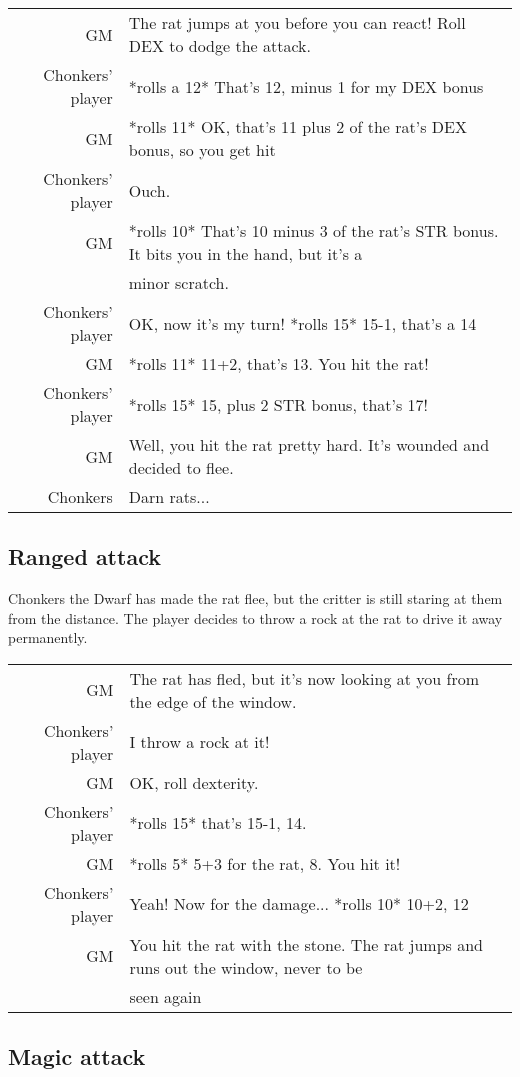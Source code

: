 \begin{tabular}{rl}
GM& The rat jumps at you before you can react! Roll DEX to dodge the attack.\\
Chonkers' player& *rolls a 12* That's 12, minus 1 for my DEX bonus\\
GM& *rolls 11* OK, that's 11 plus 2 of the rat's DEX bonus, so you get hit\\
Chonkers' player& Ouch. \\
GM& *rolls 10* That's 10 minus 3 of the rat's STR bonus. It bits you in the hand, but it's a \\
& minor scratch.\\
Chonkers' player& OK, now it's my turn! *rolls 15* 15-1, that's a 14\\
GM& *rolls 11* 11+2, that's 13. You hit the rat!\\
Chonkers' player& *rolls 15* 15, plus 2 STR bonus, that's 17!\\
GM& Well, you hit the rat pretty hard. It's wounded and decided to flee.\\
Chonkers& Darn rats...\\
\end{tabular}

\subsection*{Ranged attack}

Chonkers the Dwarf has made the rat flee, but the critter is still staring at them from the distance. The player decides to throw a rock at the rat to drive it away permanently.

\begin{tabular}{rl}
GM& The rat has fled, but it's now looking at you from the edge of the window.\\
Chonkers' player& I throw a rock at it!\\
GM& OK, roll dexterity.\\
Chonkers' player& *rolls 15* that's 15-1, 14. \\
GM& *rolls 5* 5+3 for the rat, 8. You hit it!\\
Chonkers' player& Yeah! Now for the damage... *rolls 10* 10+2, 12\\
GM& You hit the rat with the stone. The rat jumps and runs out the window, never to be \\ & seen again\\
\end{tabular}

\subsection*{Magic attack}

